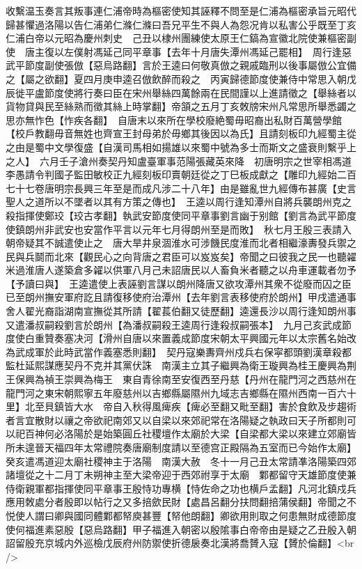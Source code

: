 收繫温玉奏言其叛事連仁浦帝時為樞密使知其誣釋不問至是仁浦為樞密承旨元昭代歸甚懼過洛陽以告仁浦弟仁滌仁滌曰吾兄平生不與人為怨况肯以私害公乎既至丁亥仁浦白帝以元昭為慶州刺史　己丑以棣州團練使太原王仁鎬為宣徽北院使兼樞密副使　唐主復以左僕射馮延己同平章事【去年十月唐失潭州馮延己罷相】　周行逢惡武平節度副使張倣【惡烏路翻】言於王逵曰何敬真倣之親戚臨刑以後事屬倣公宜備之【屬之欲翻】夏四月庚申逵召倣飲醉而殺之　丙寅歸德節度使兼侍中常思入朝戊辰徙平盧節度使將行奏曰臣在宋州舉絲四萬餘兩在民間謹以上進請徵之【舉絲者以貨物貸與民至絲熟而徵其絲上時掌翻】帝頷之五月丁亥敇牓宋州凡常思所舉悉蠲之思亦無怍色【怍疾各翻】　自唐末以來所在學校廢絶蜀毋昭裔出私財百萬營學館【校戶教翻毋音無姓也齊宣王封母弟於毋鄉其後因以為氏】且請刻板印九經蜀主從之由是蜀中文學復盛【自漢司馬相如揚雄以來蜀中號為多士而斯文之盛衰則繫乎上之人】　六月壬子滄州奏契丹知盧臺軍事范陽張藏英來降　初唐明宗之世宰相馮道李愚請令判國子監田敏校正九經刻板印賣朝廷從之丁巳板成獻之【雕印九經始二百七十七卷唐明宗長興三年至是而成凡涉二十八年】由是雖亂世九經傳布甚廣【史言聖人之道所以不墜者以其有方策之傳也】　王逵以周行逢知潭州自將兵襲朗州克之殺指揮使鄭珓【珓古孝翻】執武安節度使同平章事劉言幽于别館【劉言為武平節度使鎮朗州非武安也安當作平言以元年七月得朗州至是而敗】　秋七月王殷三表請入朝帝疑其不誠遣使止之　唐大旱井泉涸淮水可涉饑民度淮而北者相繼濠夀發兵禦之民與兵鬬而北來【觀民心之向背唐之君臣可以岌岌矣】帝聞之曰彼我之民一也聽糴米過淮唐人遂築倉多糴以供軍八月己未詔唐民以人畜負米者聽之以舟車運載者勿予【予讀曰與】　王逵遣使上表誣劉言謀以朗州降唐又欲攻潭州其衆不從廢而囚之臣已至朗州撫安軍府訖且請復移使府治潭州【去年劉言表移使府於朗州】甲戌遣通事舍人翟光裔詣湖南宣撫從其所請【翟萇伯翻又徒歷翻】逵還長沙以周行逢知朗州事又遣潘叔嗣殺劉言於朗州【為潘叔嗣殺王逵周行逢殺叔嗣張本】　九月己亥武成節度使白重贊奏塞决河【滑州自唐以來置義成節度宋朝太平興國元年以太宗舊名始改為武成軍於此時武當作義塞悉則翻】　契丹寇樂夀齊州戍兵右保寜都頭劉漢章殺都監杜延熙謀應契丹不克并其黨伏誅　南漢主立其子繼興為衛王璇興為桂王慶興為荆王保興為禎王崇興為梅王　東自青徐南至安復西至丹慈【丹州在龍門河之西慈州在龍門河之東宋朝熙寧五年廢慈州以吉鄉縣屬隰州九域志吉鄉縣在隰州西南一百六十里】北至貝鎮皆大水　帝自入秋得風痺疾【痺必至翻又毗至翻】害於食飲及步趨術者言宜散財以禳之帝欲祀南郊又以自梁以來郊祀常在洛陽疑之執政曰天子所都則可以祀百神何必洛陽於是始築圓丘社稷壇作太廟於大梁【自梁都大梁以來建立郊廟皆所未遑晉天福四年太常禮院奏唐廟制度請以至德宫正殿隔為五室而已今始作太廟】癸亥遣馮道迎太廟社稷神主于洛陽　南漢大赦　冬十一月己丑太常請凖洛陽築四郊諸壇從之十二月丁未朔神主至大梁帝迎于西郊祔享于太廟　鄴都留守天雄節度使兼侍衛親軍都指揮使同平章事王殷恃功專横【恃佐命之功也横戶孟翻】凡河北鎮戍兵應用敇處分者殷即以帖行之又多掊歛民財【處昌呂翻分扶問翻掊蒲侯翻】帝聞之不悦使人謂曰卿與國同體鄴都帑庾甚豐【帑他朗翻】卿欲用則取之何患無財成德節度使何福進素惡殷【惡烏路翻】甲子福進入朝密以殷隂事白帝帝由是疑之乙丑殷入朝詔留殷充京城内外巡檢戊辰府州防禦使折德扆奏北漢將喬贇入寇【贇於倫翻】<br />
